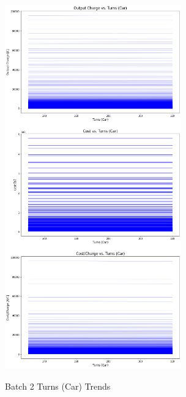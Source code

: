 \begin{figure}
    \begin{center}
    \includegraphics[width=3in]{fig26.png}
    \end{center}
    \renewcommand{\baselinestretch}{1}
    \small\normalsize
    \begin{quote}
    \caption[Batch 2 Turns (Car) Trends]{Batch 2 Turns (Car) Trends} \label{fig: f26}
    \end{quote}
\end{figure}

